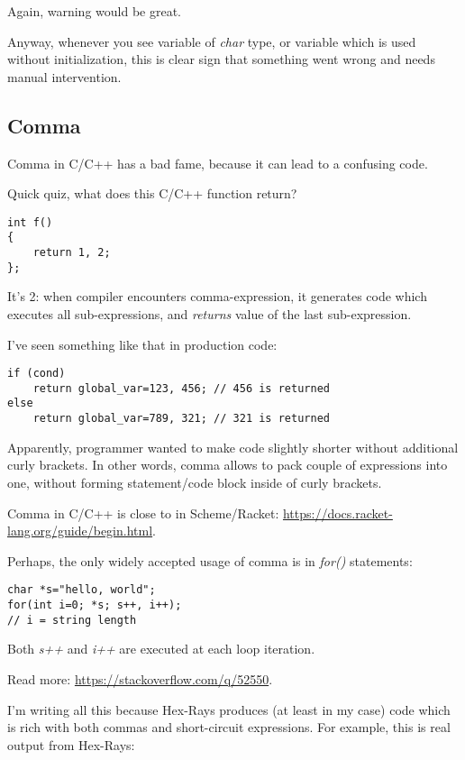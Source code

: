 Again, warning would be great.

Anyway, whenever you see variable of \emph{char} type, or variable which is used without initialization, this is clear sign
that something went wrong and needs manual intervention.

\subsection{Comma}

Comma in C/C++ has a bad fame, because it can lead to a confusing code.

Quick quiz, what does this C/C++ function return?

\begin{lstlisting}[style=customc]
int f()
{
	return 1, 2;
};
\end{lstlisting}

It's 2: when compiler encounters comma-expression, it generates code which executes all sub-expressions, and
\emph{returns} value of the last sub-expression.

I've seen something like that in production code:

\begin{lstlisting}[style=customc]
if (cond)
	return global_var=123, 456; // 456 is returned
else
	return global_var=789, 321; // 321 is returned
\end{lstlisting}

Apparently, programmer wanted to make code slightly shorter without additional curly brackets.
In other words, comma allows to pack couple of expressions into one, without forming
statement/code block inside of curly brackets.

Comma in C/C++ is close to  in Scheme/Racket: \url{https://docs.racket-lang.org/guide/begin.html}.

Perhaps, the only widely accepted usage of comma is in \emph{for()} statements:

\begin{lstlisting}[style=customc]
char *s="hello, world";
for(int i=0; *s; s++, i++);
// i = string length
\end{lstlisting}

Both \emph{s++} and \emph{i++} are executed at each loop iteration.

Read more: \url{https://stackoverflow.com/q/52550}.

I'm writing all this because Hex-Rays produces (at least in my case) code which is rich with both commas and short-circuit
expressions.
For example, this is real output from Hex-Rays:

